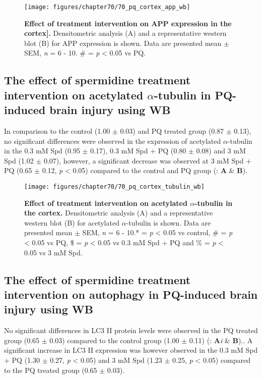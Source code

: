 \begin{figure}[!htbp]
\center
  \texttt{[image: figures/chapter70/70\_pq\_cortex\_app\_wb]}
  \caption[Effect of treatment intervention on APP expression in the cortex]{\textbf{Effect of treatment intervention on APP expression in the cortex].} Densitometric analysis (A) and a representative western blot (B) for APP expression is shown. Data are presented  mean $\pm$ SEM, \textit{n} = 6 - 10. \# = \textit{p} < 0.05 vs PQ.}
  \label{fig:70_pq_cortex_app_wb}
\end{figure} 

\subsection{The effect of spermidine treatment intervention on acetylated $\alpha$-tubulin in PQ-induced brain injury using WB}
In comparison to the control (1.00 $\pm$ 0.03) and PQ treated group (0.87 $\pm$ 0.13), no significant differences were observed in the expression of acetylated $\alpha$-tubulin in the 0.3 mM Spd (0.95 $\pm$ 0.17), 0.3 mM Spd + PQ (0.80 $\pm$ 0.08) and 3 mM Spd (1.02 $\pm$ 0.07), however, a significant decrease was observed at 3 mM Spd + PQ (0.65 $\pm$ 0.12, \textit{p} < 0.05) compared to the control and PQ group (: \textbf{A} \& \textbf{B}). 

\begin{figure}[!htbp]
\center
  \texttt{[image: figures/chapter70/70\_pq\_cortex\_tubulin\_wb]}
  \caption[Effect of treatment intervention on acetylated $\alpha$-tubulin expression in the cortex]{\textbf{Effect of treatment intervention on acetylated $\alpha$-tubulin in the cortex.} Densitometric analysis (A) and a representative western blot (B) for acetylated $\alpha$-tubulin is shown. Data are presented  mean $\pm$ SEM, \textit{n} = 6 - 10.* = \textit{p} < 0.05 vs control, \# = \textit{p} < 0.05 vs PQ, \$ = \textit{p} < 0.05 vs 0.3 mM Spd + PQ and \% = \textit{p} < 0.05 vs 3 mM Spd.}
  \label{fig:70_pq_cortex_tubulin_wb}
\end{figure} 

\subsection{The effect of spermidine treatment intervention on autophagy in PQ-induced brain injury using WB}
No significant differences in LC3 II protein levels were observed in the PQ treated group (0.65 $\pm$ 0.03) compared to the control group (1.00 $\pm$ 0.11) (: \textbf{A}\textit{i} \& \textbf{B}).. A significant increase in LC3 II expression was however observed in the 0.3 mM Spd + PQ (1.30 $\pm$ 0.27, \textit{p} < 0.05) and 3 mM Spd (1.23 $\pm$ 0.25, \textit{p} < 0.05) compared to the PQ treated group (0.65 $\pm$ 0.03). 

